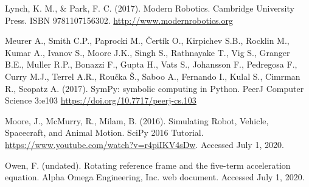 Lynch, K. M., \& Park, F. C. (2017). Modern Robotics. Cambridge University Press. ISBN 9781107156302. \url{http://www.modernrobotics.org}

Meurer A., Smith C.P., Paprocki M., Čertík O., Kirpichev S.B., Rocklin M., Kumar A., Ivanov S., Moore J.K., Singh S., Rathnayake T., Vig S., Granger B.E., Muller R.P., Bonazzi F., Gupta H., Vats S., Johansson F., Pedregosa F., Curry M.J., Terrel A.R., Roučka Š., Saboo A., Fernando I., Kulal S., Cimrman R., Scopatz A. (2017). SymPy: symbolic computing in Python. PeerJ Computer Science 3:e103 \url{https://doi.org/10.7717/peerj-cs.103}

Moore, J., McMurry, R., Milam, B. (2016). Simulating Robot, Vehicle, Spacecraft, and Animal Motion. SciPy 2016 Tutorial. \url{https://www.youtube.com/watch?v=r4piIKV4sDw}. Accessed July 1, 2020.

Owen, F. (undated). Rotating reference frame and the five-term acceleration equation. Alpha Omega Engineering, Inc. web document. Accessed July 1, 2020.
